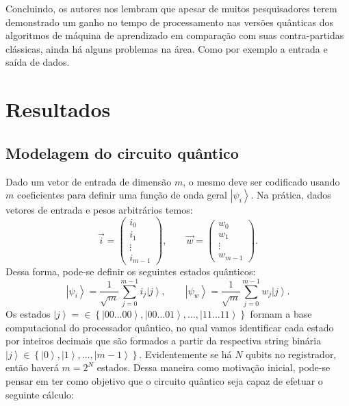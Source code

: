 Concluindo, os autores nos lembram que apesar de muitos pesquisadores terem demonstrado um ganho no tempo de processamento nas versões quânticas dos algoritmos de máquina de aprendizado em comparação com suas contra-partidas clássicas, ainda há alguns problemas na área. Como por exemplo a entrada e saída de dados.


\chapter{Resultados}

\section{Modelagem do circuito quântico}

Dado um vetor de entrada de dimensão $m$, o mesmo deve ser codificado usando $m$  coeficientes para definir uma função de onda geral $\left|\psi_{i}\right\rangle $. Na prática, dados vetores de entrada e pesos arbitrários temos:
\begin{equation}\overrightarrow{i}=\left(\begin{array}{c}
i_{0}\\
i_{1}\\
\vdots\\
i_{m-1}
\end{array}\right),\qquad\overrightarrow{w}=\left(\begin{array}{c}
w_{0}\\
w_{1}\\
\vdots\\
w_{m-1}
\end{array}\right). \end{equation}
Dessa forma, pode-se definir os seguintes estados quânticos:
\begin{equation}\left|\psi_{i}\right\rangle =\frac{1}{\sqrt{m}}\sum_{j=0}^{m-1}i_{j}\left|j\right\rangle, \qquad\left|\psi_{w}\right\rangle =\frac{1}{\sqrt{m}}\sum_{j=0}^{m-1}w_{j}\left|j\right\rangle  . \end{equation}
Os estados $\left|j\right\rangle =\in\left\{ \left|00\ldots00\right\rangle ,\left|00\ldots01\right\rangle ,\dots,\left|11\ldots11\right\rangle \right\} $ formam a base computacional do processador quântico, no qual vamos identificar cada estado por inteiros decimais que são formados a partir da respectiva string binária $\left|j\right\rangle \in\left\{ \left|0\right\rangle ,\left|1\right\rangle ,\dots,\left|m-1\right\rangle \right\} $. Evidentemente se há $N$ qubits no registrador, então haverá  $m=2^{N}$ estados. Dessa maneira como motivação inicial, pode-se pensar em ter como objetivo  que o circuito quântico seja capaz de efetuar o seguinte cálculo:
